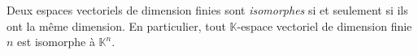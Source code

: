 \documentclass[french,11pt,twoside]{VcCours}
\newcommand{\Sum}[2]{\sum_{#1}^{#2}}
\begin{document}
%

\begin{Corollaire}{} Deux espaces vectoriels de dimension finies sont \emph{isomorphes} si et seulement si ils ont la même dimension. En particulier, tout $\mathbb{K}$-espace vectoriel de dimension finie $n$ est isomorphe à $\mathbb{K}^n$.
\end{Corollaire}
\end{document}
